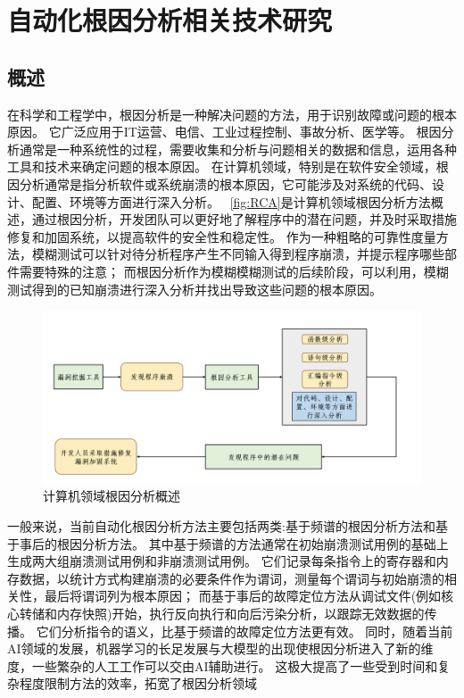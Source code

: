 

\cleardoublepage
\section{自动化根因分析相关技术研究}        %
\subsection{概述}
在科学和工程学中，根因分析是一种解决问题的方法，用于识别故障或问题的根本原因。
它广泛应用于IT运营、电信、工业过程控制、事故分析、医学等。
根因分析通常是一种系统性的过程，需要收集和分析与问题相关的数据和信息，运用各种工具和技术来确定问题的根本原因。
在计算机领域，特别是在软件安全领域，根因分析通常是指分析软件或系统崩溃的根本原因，它可能涉及对系统的代码、设计、配置、环境等方面进行深入分析。
~\autoref{fig:RCA}是计算机领域根因分析方法概述，通过根因分析，开发团队可以更好地了解程序中的潜在问题，并及时采取措施修复和加固系统，以提高软件的安全性和稳定性。
作为一种粗略的可靠性度量方法，模糊测试可以针对待分析程序产生不同输入得到程序崩溃，并提示程序哪些部件需要特殊的注意；
而根因分析作为模糊模糊测试的后续阶段，可以利用，模糊测试得到的已知崩溃进行深入分析并找出导致这些问题的根本原因。
\begin{figure}[h]
    \centering
    \includegraphics[width=1.0\textwidth]{./figure/RCA.png}
    \caption{计算机领域根因分析概述}
    \label{fig:RCA}
\end{figure}

一般来说，当前自动化根因分析方法主要包括两类:基于频谱的根因分析方法和基于事后的根因分析方法。
其中基于频谱的方法通常在初始崩溃测试用例的基础上生成两大组崩溃测试用例和非崩溃测试用例。
它们记录每条指令上的寄存器和内存数据，以统计方式构建崩溃的必要条件作为谓词，测量每个谓词与初始崩溃的相关性，最后将谓词列为根本原因；
而基于事后的故障定位方法从调试文件(例如核心转储和内存快照)开始，执行反向执行和向后污染分析，以跟踪无效数据的传播。
它们分析指令的语义，比基于频谱的故障定位方法更有效。
同时，随着当前AI领域的发展，机器学习的长足发展与大模型的出现使根因分析进入了新的维度，一些繁杂的人工工作可以交由AI辅助进行。
这极大提高了一些受到时间和复杂程度限制方法的效率，拓宽了根因分析领域

